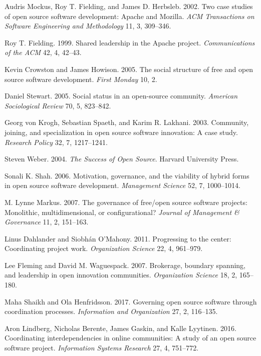 
Audris Mockus, Roy T. Fielding, and James D. Herbsleb. 2002. Two case studies of open source software development: Apache and Mozilla. \emph{ACM Transactions on Software Engineering and Methodology} 11, 3, 309--346.

Roy T. Fielding. 1999. Shared leadership in the Apache project. \emph{Communications of the ACM} 42, 4, 42--43.

Kevin Crowston and James Howison. 2005. The social structure of free and open source software development. \emph{First Monday} 10, 2.

Daniel Stewart. 2005. Social status in an open-source community. \emph{American Sociological Review} 70, 5, 823--842.

Georg von Krogh, Sebastian Spaeth, and Karim R. Lakhani. 2003. Community, joining, and specialization in open source software innovation: A case study. \emph{Research Policy} 32, 7, 1217--1241.

Steven Weber. 2004. \emph{The Success of Open Source}. Harvard University Press.

Sonali K. Shah. 2006. Motivation, governance, and the viability of hybrid forms in open source software development. \emph{Management Science} 52, 7, 1000--1014.

M. Lynne Markus. 2007. The governance of free/open source software projects: Monolithic, multidimensional, or configurational? \emph{Journal of Management \& Governance} 11, 2, 151--163.

Linus Dahlander and Siobh\'an O'Mahony. 2011. Progressing to the center: Coordinating project work. \emph{Organization Science} 22, 4, 961--979.

Lee Fleming and David M. Waguespack. 2007. Brokerage, boundary spanning, and leadership in open innovation communities. \emph{Organization Science} 18, 2, 165--180.

Maha Shaikh and Ola Henfridsson. 2017. Governing open source software through coordination processes. \emph{Information and Organization} 27, 2, 116--135.

Aron Lindberg, Nicholas Berente, James Gaskin, and Kalle Lyytinen. 2016. Coordinating interdependencies in online communities: A study of an open source software project. \emph{Information Systems Research} 27, 4, 751--772.

